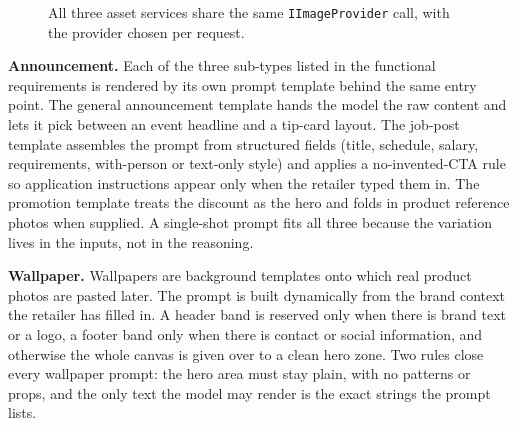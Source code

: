 \begin{figure}[H]
{%
}
\caption{All three asset services share the same \texttt{IImageProvider} call, with the provider chosen per request.}
\label{fig:image-provider-interface}
\end{figure}

\textbf{Announcement.} Each of the three sub-types listed in the functional requirements is rendered by its own prompt template behind the same entry point. The general announcement template hands the model the raw content and lets it pick between an event headline and a tip-card layout. The job-post template assembles the prompt from structured fields (title, schedule, salary, requirements, with-person or text-only style) and applies a no-invented-CTA rule so application instructions appear only when the retailer typed them in. The promotion template treats the discount as the hero and folds in product reference photos when supplied. A single-shot prompt fits all three because the variation lives in the inputs, not in the reasoning.

\textbf{Wallpaper.} Wallpapers are background templates onto which real product photos are pasted later. The prompt is built dynamically from the brand context the retailer has filled in. A header band is reserved only when there is brand text or a logo, a footer band only when there is contact or social information, and otherwise the whole canvas is given over to a clean hero zone. Two rules close every wallpaper prompt: the hero area must stay plain, with no patterns or props, and the only text the model may render is the exact strings the prompt lists.

